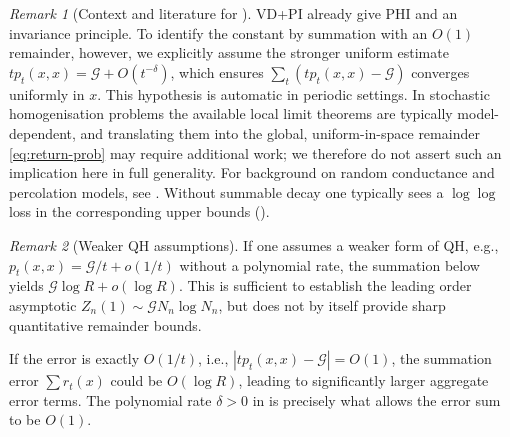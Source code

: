\documentclass[reqno]{amsart}
\numberwithin{equation}{section}
\theoremstyle{definition}
\theoremstyle{remark}
\newtheorem{remark}[remark]{Remark}
\newcommand{\cG}{\mathcal{G}}
\begin{document}
\begin{remark}[Context and literature for ]\label{rem:QH_validity}
VD+PI already give PHI and an invariance principle. To identify the constant by summation with an $O(1)$ remainder, however, we explicitly assume the stronger uniform estimate $t p_t(x,x)=\cG+O(t^{-\delta})$, which ensures $\sum_t (t p_t(x,x)-\cG)$ converges uniformly in $x$. This hypothesis is automatic in periodic settings. In stochastic homogenisation problems the available local limit theorems are typically model-dependent, and translating them into the global, uniform-in-space remainder \eqref{eq:return-prob} may require additional work; we therefore do not assert such an implication here in full generality. For background on random conductance and percolation models, see \cite{Biskup11,AndresDeuschelSlowik19,Barlow04,ArmstrongDario18,GloriaOtto17,CroydonHambly21}. Without summable decay one typically sees a $\log\log$ loss in the corresponding upper bounds ().
\end{remark}


\begin{remark}[Weaker QH assumptions]\label{rem:weaker_QH}
If one assumes a weaker form of QH, e.g., $p_t(x,x) = \cG/t + o(1/t)$ without a polynomial rate, the summation below yields $\cG \log R + o(\log R)$. This is sufficient to establish the leading order asymptotic $Z_n(1) \sim \cG N_n \log N_n$, but does not by itself provide sharp quantitative remainder bounds.

If the error is exactly $O(1/t)$, i.e., $|t p_t(x,x) - \cG| = O(1)$, the summation error $\sum r_t(x)$ could be $O(\log R)$, leading to significantly larger aggregate error terms. The polynomial rate $\delta>0$ in  is precisely what allows the error sum to be $O(1)$.
\end{remark}
\end{document}
